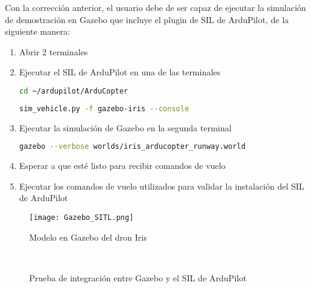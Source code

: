 Con la corrección anterior, el usuario debe de ser capaz de ejecutar la simulación de demostración en Gazebo que incluye el plugin de SIL de ArduPilot, de la siguiente manera:

\begin{enumerate}
    \item Abrir 2 terminales
    \item Ejecutar el SIL de ArduPilot en una de las terminales
    \begin{lstlisting}[language = bash]
        cd ~/ardupilot/ArduCopter
    \end{lstlisting}  
    \begin{lstlisting}[language = bash]
        sim_vehicle.py -f gazebo-iris --console
    \end{lstlisting} 
    \item Ejecutar la simulación de Gazebo en la segunda terminal
    \begin{lstlisting}[language = bash]
        gazebo --verbose worlds/iris_arducopter_runway.world
    \end{lstlisting} 
    \item Esperar a que esté listo para recibir comandos de vuelo
    \item Ejecutar los comandos de vuelo utilizados para validar la instalación del SIL de ArduPilot
\end{enumerate}

\begin{figure}[ht]
    \centering
    \texttt{[image: Gazebo\_SITL.png]}
    \caption{Modelo en Gazebo del dron Iris}
    \label{fig:Gazebo_SIL}
\end{figure}

\begin{figure}[ht]
    \centering
    \hfill
    \\
    \hfill
    \caption{Prueba de integración entre Gazebo y el SIL de ArduPilot}
    \label{fig:Gazebo_Ardupilot}
\end{figure}

